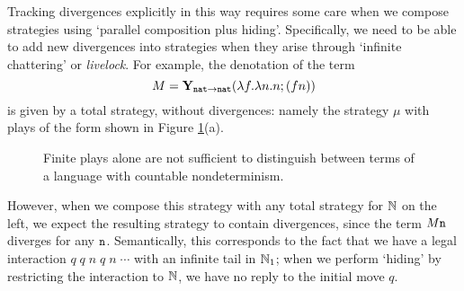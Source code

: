 \documentclass[sigplan,9pt,review]{acmart}\settopmatter{printfolios=true,printccs=false,printacmref=false}
\begin{document}
Tracking divergences explicitly in this way requires some care when we compose strategies using `parallel composition plus hiding'.
Specifically, we need to be able to add new divergences into strategies when they arise through `infinite chattering' or \emph{livelock}.  
For example, the denotation of the term
\[
  M = \mathbf{Y}_{{\mathtt{nat}}\to{\mathtt{nat}}}(\lambda f.\lambda n.n;(f n))
  \]
is given by a total strategy, without divergences: namely the strategy $\mu$ with plays of the form shown in Figure \ref{fig:mn-plays}(a).
\begin{figure}
  \caption{Finite plays alone are not sufficient to distinguish between terms of a language with countable nondeterminism.}
  \label{fig:mn-plays}
\end{figure}
However, when we compose this strategy with any total strategy for $\mathbb{N}$ on the left, we expect the resulting strategy to contain divergences, since the term $M {\mathtt{n}}$ diverges for any ${\mathtt{n}}$.
Semantically, this corresponds to the fact that we have a legal interaction $q\;q\;n\;q\;n\;\cdots$ with an infinite tail in $\mathbb{N}_1$; when we perform `hiding' by restricting the interaction to $\mathbb{N}$, we have no reply to the initial move $q$.
\end{document}
